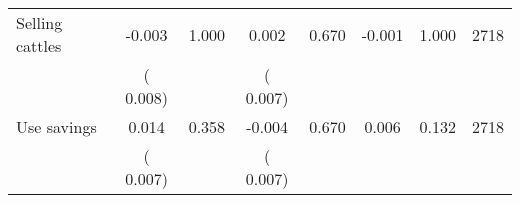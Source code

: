 \begin{tabular}{l*{7}{c}}
 Selling cattles       &             -0.003       &        1.000  &              0.002       &        0.670  &             -0.001       &              1.000 &  2718 \\ 
                       &       (       0.008)             &                               &       (       0.007)                     &                               &                                               &                                &                      \\ 

 Use savings       &              0.014       &        0.358  &             -0.004       &        0.670  &              0.006       &              0.132 &  2718 \\ 
                       &       (       0.007)             &                               &       (       0.007)                     &                               &                                               &                                &                      \\ 

\hline \end{tabular}